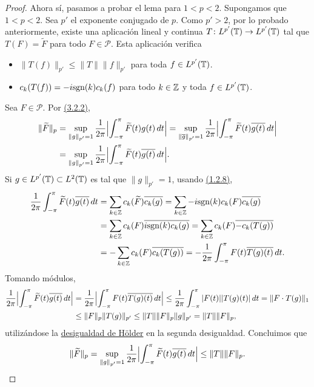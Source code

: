 \documentclass[a4paper, 12pt]{book}
\begin{document}
\begin{proof}
    Ahora sí, pasamos a probar el lema para $1 < p < 2$. Supongamos que $1<p<2$. Sea $p'$ el exponente conjugado de $p$. Como $p' > 2$, por lo probado anteriormente, existe una aplicación lineal y continua $T \colon L^{p'}(\mathbb T)\to L^{p'}(\mathbb T)$ tal que $T(F) = \widetilde{F}$ para todo $F \in \mathcal{P}$. Esta aplicación verifica
    \begin{itemize}
        \item $\|T(f)\|_{p'}\leq \|T\|\|f\|_{p'}$ para toda $f \in L^{p'}(\mathbb T)$.
        \item $c_k(T(f)) = -i\textup{sgn}(k)c_k(f)$ para todo $k\in\mathbb Z$ y toda $f \in L^{p'}(\mathbb T)$.
    \end{itemize}
    Sea $F \in \mathcal{P}$. Por \hyperref[3.2.2]{(3.2.2)},
    \[\begin{aligned}[t]
        \|\widetilde{F}\|_p &=  \sup_{\|g\|_{p'} = 1} \frac{1}{2\pi}\Bigl|\int_{-\pi}^{\pi} \widetilde{F}(t)g(t) \, dt\Bigr| = \sup_{\|\overline{g}\|_{p'} = 1} \frac{1}{2\pi}\Bigl|\int_{-\pi}^{\pi} \widetilde{F}(t)\overline{g(t)} \, dt\Bigr| \\
        &= \sup_{\|g\|_{p'} = 1} \frac{1}{2\pi}\Bigl|\int_{-\pi}^{\pi} \widetilde{F}(t)\overline{g(t)} \, dt\Bigr|.
    \end{aligned}\]
    Si $g \in L^{p'}(\mathbb T) \subset L^2(\mathbb T)$ es tal que $\|g\|_{p'} = 1$, usando \hyperref[1.2.8]{(1.2.8)},
    \begin{align*}
        \frac{1}{2\pi}\int_{-\pi}^{\pi} \widetilde{F}(t)\overline{g(t)} \, dt &= \sum_{k\in\mathbb Z} c_k(\widetilde{F})\overline{c_k(g)} = \sum_{k\in\mathbb Z} -i\textup{sgn}(k)c_k(F)\overline{c_k(g)} \\
        &= \sum_{k\in\mathbb Z}c_k(F)\overline{i\textup{sgn}(k)c_k(g)} = \sum_{k\in\mathbb Z}c_k(F)\overline{-c_k(T(g))} \\
        &= -\sum_{k\in\mathbb Z}c_k(F)\overline{c_k(T(g))} =-\frac{1}{2\pi}\int_{-\pi}^{\pi} F(t)\overline{T(g)(t)} \, dt.
    \end{align*}
    Tomando módulos,
    \begin{align*}
        \frac{1}{2\pi}\Bigl|\int_{-\pi}^{\pi} \widetilde{F}(t)\overline{g(t)} \, dt\Bigr| &= \frac{1}{2\pi}\Bigl|\int_{-\pi}^{\pi} F(t)\overline{T(g)(t)} \, dt\Bigr| \leq \frac{1}{2\pi}\int_{-\pi}^{\pi} |F(t)||T(g)(t)| \, dt = \|F \cdot T(g)\|_1 \\ 
        &\leq \|F\|_p\|T(g)\|_{p'} \leq \|T\|\|F\|_p\|g\|_{p'} = \|T\|\|F\|_p,
    \end{align*} 
    utilizándose la \hyperref[1.1.1]{desigualdad de Hölder} en la segunda desigualdad. Concluimos que
    \[\|\widetilde{F}\|_p = \sup_{\|g\|_{p'}=1}\frac{1}{2\pi}\Bigl|\int_{-\pi}^{\pi} \widetilde{F}(t)\overline{g(t)} \, dt\Bigr| \leq \|T\|\|F\|_p. \qedhere\]
\end{proof}
\end{document}
